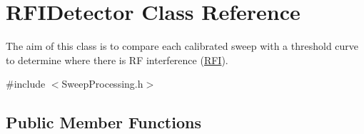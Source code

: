 \hypertarget{classRFIDetector}{}\section{R\+F\+I\+Detector Class Reference}
\label{classRFIDetector}


The aim of this class is to compare each calibrated sweep with a threshold curve to determine where there is RF interference (\hyperlink{structRFI}{R\+FI}).  




{\ttfamily \#include $<$Sweep\+Processing.\+h$>$}

\subsection*{Public Member Functions}
